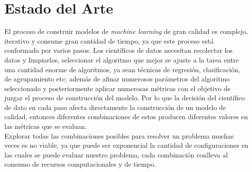 \chapter{Estado del Arte}\label{chapter:state-of-the-art}

El proceso de construir modelos de \textit{machine learning} de gran calidad es complejo, iterativo y consume gran cantidad de tiempo, ya que este proceso está conformado por varios pasos. Los científicos de datos necesitan recolectar los datos y limpiarlos, seleccionar el algoritmo que mejor se ajuste a la tarea entre una cantidad enorme de algoritmos, ya sean técnicas de regresión, clasificación, de agrupamiento etc; además de afinar numerosos parámetros del algoritmo seleccionado y posteriormente aplicar numerosas métricas con el objetivo de juzgar el proceso de construcción del modelo. Por lo que la decisión del científico de dato en cada paso afecta directamente la construcción de un modelo de calidad, entonces diferentes combinaciones de estos producen diferentes valores en las métricas que se evaluan. \\

Explorar todas las combinaciones posibles para resolver un problema muchas veces es no viable, ya que puede ser exponencial la cantidad de configuraciones en las cuales se puede evaluar nuestro problema, cada combinación conlleva al consumo de recursos computacionales y de tiempo. \\

